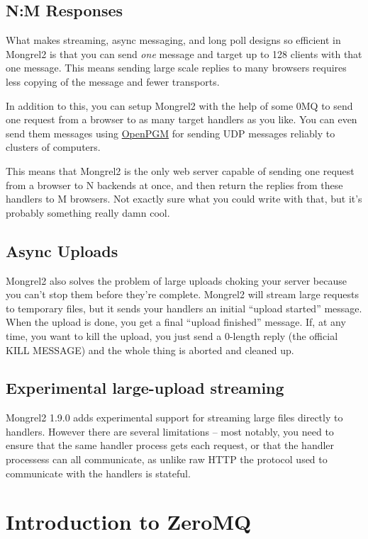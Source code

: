 \subsection{N:M Responses}

What makes streaming, async messaging, and long poll designs so efficient in Mongrel2 is that you can send
\emph{one} message and target up to 128 clients with that one message.  This means sending large scale replies
to many browsers requires less copying of the message and fewer transports.

In addition to this, you can setup Mongrel2 with the help of some 0MQ to send
one request from a browser to as many target handlers as you like.  You can
even send them messages using \href{http://code.google.com/p/openpgm/}{OpenPGM}
for sending UDP messages reliably to clusters of computers.

This means that Mongrel2 is the only web server capable of sending one request
from a browser to N backends at once, and then return the replies from these
handlers to M browsers.  Not exactly sure what you could write with that, but
it's probably something really damn cool.

\subsection{Async Uploads}

Mongrel2 also solves the problem of large uploads choking your server
because you can't stop them before they're complete.  Mongrel2 will stream
large requests to temporary files, but it sends your handlers an initial
``upload started'' message.  When the upload is done, you get a final ``upload 
finished'' message.  If, at any time, you want to kill the upload, you just
send a 0-length reply (the official KILL MESSAGE) and the whole thing is
aborted and cleaned up.

\subsection{Experimental large-upload streaming}

Mongrel2 1.9.0 adds experimental support for streaming large files directly to
handlers.  However there are several limitations -- most notably, you need to
ensure that the same handler process gets each request, or that the handler
processess can all communicate, as unlike raw HTTP the protocol used to
communicate with the handlers is stateful.


\section{Introduction to ZeroMQ}

